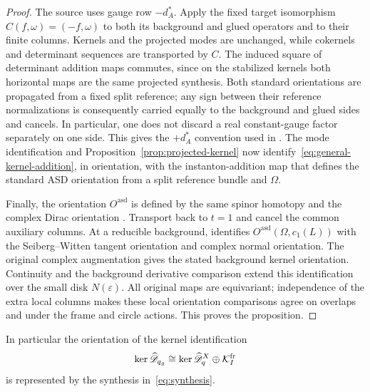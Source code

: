 \documentclass[11pt]{amsart}
\theoremstyle{definition}
\theoremstyle{remark}
\theoremstyle{plain}
\newcommand{\cK}{\mathcal{K}}
\begin{document}
\begin{proof}
The source uses gauge row $-d_A^*$.  Apply the fixed target
isomorphism $C(f,\omega)=(-f,\omega)$ to both its background and
glued operators and to their finite columns.  Kernels and the
projected modes are unchanged, while cokernels and determinant
sequences are transported by $C$.  The induced square of determinant
addition maps commutes, since on the stabilized kernels both
horizontal maps are the same projected synthesis.  Both standard
orientations are propagated from a fixed split reference; any sign
between their reference normalizations is consequently carried
equally to the background and glued sides and cancels.  In particular,
one does not discard a real constant-gauge factor separately on one
side.  This gives the $+d_A^*$ convention used in
\cite[Section~2.2]{FeehanLenessII}.
The mode identification and Proposition~\ref{prop:projected-kernel}
now identify~\eqref{eq:general-kernel-addition}, in orientation,
with the instanton-addition map that defines the standard ASD
orientation from a split reference bundle and $\Omega$.

Finally, the orientation $O^{\mathrm{asd}}$ is defined by the same
spinor homotopy and the complex Dirac orientation
\cite[Lemma~2.2, Equation~(2.5), and Definition~2.3]{FeehanLenessII}.
Transport back to $t=1$ and cancel the common auxiliary columns.
At a reducible background,
\cite[Lemma~2.6]{FeehanLenessII} identifies
$O^{\mathrm{asd}}(\Omega,c_1(L))$ with the Seiberg--Witten tangent
orientation and complex normal orientation.  The original complex
augmentation gives the stated background kernel orientation.
Continuity and the background derivative comparison extend this
identification over the small disk $N(\varepsilon)$.
All original maps are equivariant; independence of the extra local
columns makes these local orientation comparisons agree on overlaps
and under the frame and circle actions.  This proves the proposition.
\end{proof}

In particular the orientation of the kernel identification
\begin{equation}\label{eq:kernel-excision}
 \ker\widehat{\mathscr D}_{q_g}
 \cong\ker\widehat{\mathscr D}^{X}_q\oplus\cK_I^{\rm fr}
\end{equation}
is represented by the synthesis in~\eqref{eq:synthesis}.
\end{document}
